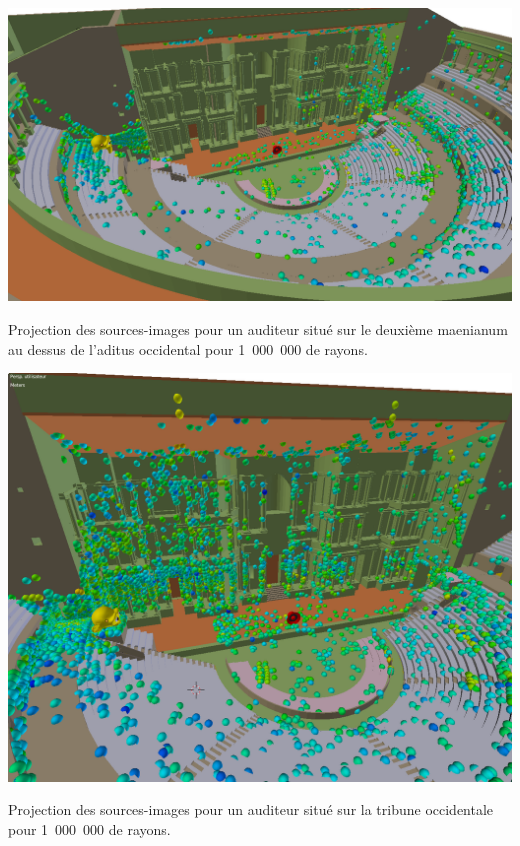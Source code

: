 \begin{figureth}
	\includegraphics[width=\linewidth]{images/Listener11}
	\caption{Projection des sources-images pour un auditeur situé sur le deuxième \gls{maenianum} au dessus de l'\gls{aditus} occidental pour 1~000~000 de rayons.}
	\label{listener11}
\end{figureth}
\begin{figureth}
	\includegraphics[width=\linewidth]{images/Listener10}
		\caption{Projection des sources-images pour un auditeur situé sur la tribune occidentale pour 1~000~000 de rayons.}
	\label{listener10}
\end{figureth}
%
